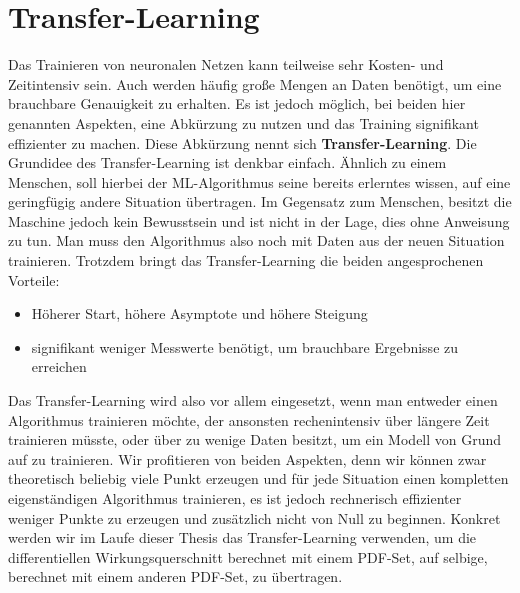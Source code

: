 \section{Transfer-Learning}
Das Trainieren von neuronalen Netzen kann teilweise sehr Kosten- und Zeitintensiv sein. Auch werden häufig große Mengen an Daten benötigt, um eine brauchbare Genauigkeit zu erhalten. Es ist jedoch möglich, bei beiden hier genannten Aspekten, eine Abkürzung zu nutzen und das Training signifikant effizienter zu machen. Diese Abkürzung nennt sich \textbf{Transfer-Learning}. 
Die Grundidee des Transfer-Learning ist denkbar einfach. Ähnlich zu einem Menschen, soll hierbei der ML-Algorithmus seine bereits erlerntes wissen, auf eine geringfügig andere Situation übertragen. Im Gegensatz zum Menschen, besitzt die Maschine jedoch kein Bewusstsein und ist nicht in der Lage, dies ohne Anweisung zu tun. Man muss den Algorithmus also noch mit Daten aus der neuen Situation trainieren. Trotzdem bringt das Transfer-Learning die beiden angesprochenen Vorteile:
\begin{itemize}
	\item Höherer Start, höhere Asymptote und höhere Steigung
	\item signifikant weniger Messwerte benötigt, um brauchbare Ergebnisse zu erreichen
\end{itemize}
Das Transfer-Learning wird also vor allem eingesetzt, wenn man entweder einen Algorithmus trainieren möchte, der ansonsten rechenintensiv über längere Zeit trainieren müsste, oder über zu wenige Daten besitzt, um ein Modell von Grund auf zu trainieren. Wir profitieren von beiden Aspekten, denn wir können zwar theoretisch beliebig viele Punkt erzeugen und für jede Situation einen kompletten eigenständigen Algorithmus trainieren, es ist jedoch rechnerisch effizienter weniger Punkte zu erzeugen und zusätzlich nicht von Null zu beginnen. Konkret werden wir im Laufe dieser Thesis das Transfer-Learning verwenden, um die differentiellen Wirkungsquerschnitt berechnet mit einem PDF-Set, auf selbige, berechnet mit einem anderen PDF-Set, zu übertragen.

